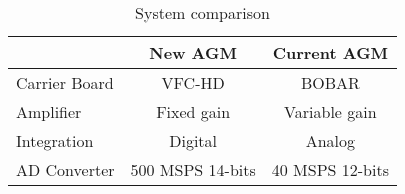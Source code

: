 \begin{table}[!hbt]
   \centering
   \begin{tabular}{| l | c | c |}
       \toprule
       & \textbf{New AGM} & \textbf{Current AGM} \\
       \midrule
        Carrier Board & VFC-HD & BOBAR \\
       \midrule
        Amplifier & Fixed gain & Variable gain \\
       \midrule
        Integration & Digital & Analog \\
       \midrule
        AD Converter & 500 MSPS 14-bits & 40 MSPS 12-bits \\
       \bottomrule
   \end{tabular}
   \caption{System comparison}
   \label{tab:system_comparison}
\end{table}

